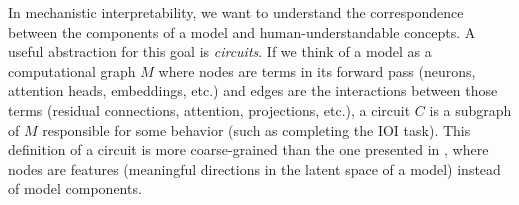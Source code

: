In mechanistic interpretability, we want to understand the correspondence between the components of a model and human-understandable concepts. A useful abstraction for this goal is \emph{circuits}. If we think of a model as a computational graph $M$ where nodes are terms in its forward pass (neurons, attention heads, embeddings, etc.) and edges are the interactions between those terms (residual connections, attention, projections, etc.), a circuit $C$ is a subgraph of $M$ responsible for some behavior (such as completing the IOI task). %
This definition of a circuit is more coarse-grained than the one presented in \citet{olah2020zoom}, where nodes are {features} (meaningful directions in the latent space of a model) instead of model components. 




